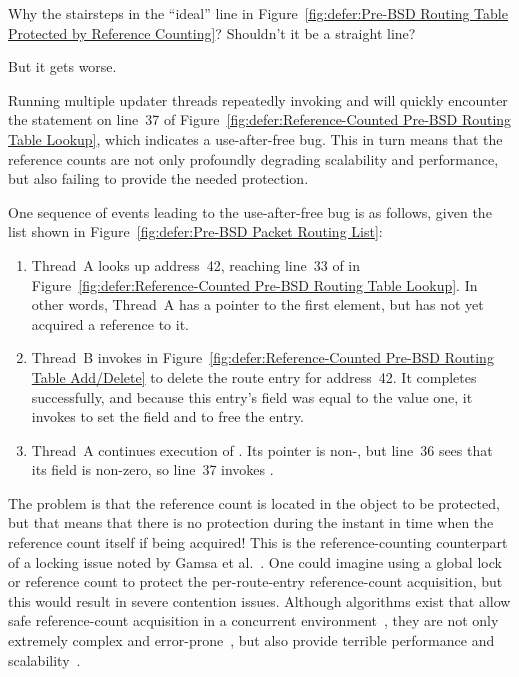 \QuickQuiz{}
	Why the stairsteps in the ``ideal'' line in
	Figure~\ref{fig:defer:Pre-BSD Routing Table Protected by Reference Counting}?
	Shouldn't it be a straight line?
 \QuickQuizEnd

But it gets worse.

Running multiple updater threads repeatedly invoking
 and  will quickly encounter the
 statement on line~37 of
Figure~\ref{fig:defer:Reference-Counted Pre-BSD Routing Table Lookup},
which indicates a use-after-free bug.
This in turn means that the reference counts are not only profoundly
degrading scalability and performance, but also failing to provide
the needed protection.

One sequence of events leading to the use-after-free bug is as follows,
given the list shown in
Figure~\ref{fig:defer:Pre-BSD Packet Routing List}:

\begin{enumerate}
\item	Thread~A looks up address~42, reaching line~33 of
	 in
	Figure~\ref{fig:defer:Reference-Counted Pre-BSD Routing Table Lookup}.
	In other words, Thread~A has a pointer to the first element,
	but has not yet acquired a reference to it.
\item	Thread~B invokes  in
	Figure~\ref{fig:defer:Reference-Counted Pre-BSD Routing Table Add/Delete}
	to delete the route entry for address~42.
	It completes successfully, and because this entry's 
	field was equal to the value one, it invokes
	 to set the  field and to free the entry.
\item	Thread~A continues execution of .
	Its  pointer is non-, but line~36 sees that
	its  field is non-zero, so line~37 invokes
	.
\end{enumerate}

The problem is that the reference count is located in the object
to be protected, but that means that there is no protection during
the instant in time when the reference count itself if being acquired!
This is the reference-counting counterpart of a locking issue noted
by Gamsa et al.~\cite{Gamsa99}.
One could imagine using a global lock or reference count to protect
the per-route-entry reference-count acquisition, but this would
result in severe contention issues.
Although algorithms exist that allow safe reference-count acquisition
in a concurrent environment~\cite{Valois95a}, they are not only extremely
complex and error-prone~\cite{MagedMichael95a}, but also provide
terrible performance and scalability~\cite{ThomasEHart2007a}.

